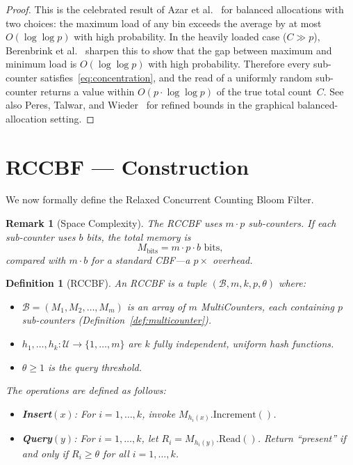 \documentclass[11pt,a4paper]{article}
\newtheorem{definition}[theorem]{Definition}
\newtheorem{remark}[theorem]{Remark}
\newcommand{\CBF}{\textsf{CBF}}
\newcommand{\RCCBF}{\textsf{RCCBF}}
\newcommand{\calB}{\mathcal{B}}
\begin{document}
\begin{proof}
This is the celebrated result of Azar et al.~\cite{azar1999} for balanced
allocations with two choices: the maximum load of any bin exceeds the
average by at most $O(\log\log p)$ with high probability.
In the heavily loaded case ($C \gg p$), Berenbrink et
al.~\cite{berenbrink2006} sharpen this to show that the gap
between maximum and minimum load is $O(\log\log p)$ with high probability.
Therefore every sub-counter satisfies~\eqref{eq:concentration}, and the
read of a uniformly random sub-counter returns a value within
$O(p \cdot \log\log p)$ of the true total count~$C$.
See also Peres, Talwar, and Wieder~\cite{peres2015} for refined bounds
in the graphical balanced-allocation setting.
\end{proof}

\section{RCCBF --- Construction}\label{sec:construction}

We now formally define the Relaxed Concurrent Counting Bloom Filter.

\begin{remark}[Space Complexity]\label{rem:space}
The \RCCBF{} uses $m \cdot p$ sub-counters.  If each sub-counter uses $b$
bits, the total memory is
\begin{equation}\label{eq:space}
  M_{\mathrm{bits}} = m \cdot p \cdot b \text{ bits},
\end{equation}
compared with $m \cdot b$ for a standard \CBF{}---a $p\times$ overhead.
\end{remark}

\begin{definition}[\RCCBF{}]\label{def:rccbf}
An \RCCBF{} is a tuple $(\calB, m, k, p, \theta)$ where:
\begin{itemize}
  \item $\calB = (M_1, M_2, \ldots, M_m)$ is an array of $m$
        MultiCounters, each containing $p$ sub-counters
        (Definition~\ref{def:multicounter}).
  \item $h_1, \ldots, h_k : \mathcal{U} \to \{1, \ldots, m\}$ are $k$
        fully independent, uniform hash functions.
  \item $\theta \ge 1$ is the query threshold.
\end{itemize}

The operations are defined as follows:
\begin{itemize}
  \item \textbf{Insert}$(x)$: For $i = 1, \ldots, k$, invoke
        $M_{h_i(x)}.\mathrm{Increment}()$.
  \item \textbf{Query}$(y)$: For $i = 1, \ldots, k$, let
        $R_i = M_{h_i(y)}.\mathrm{Read}()$.
        Return ``present'' if and only if $R_i \ge \theta$ for all
        $i = 1, \ldots, k$.
\end{itemize}
\end{definition}
\end{document}
